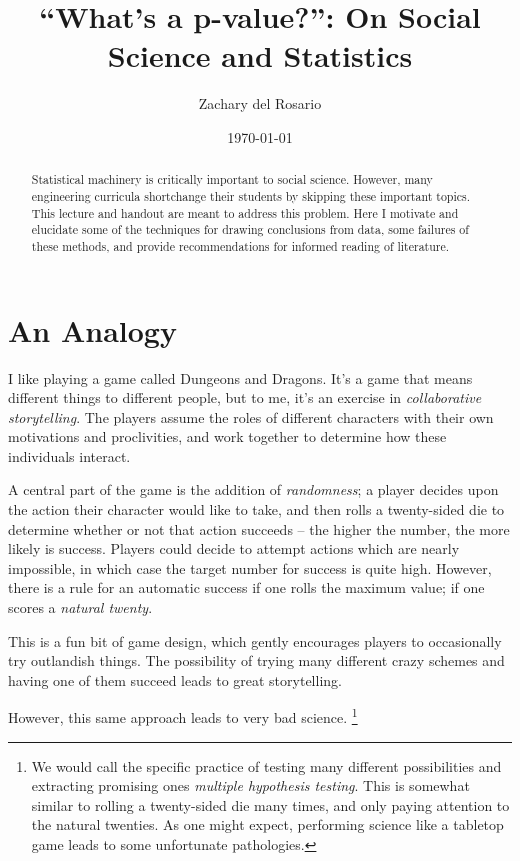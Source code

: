 \documentclass{tufte-handout}
\author{Zachary del Rosario}
\date{\today}
\title{``What's a p-value?'': On Social Science and Statistics}
\begin{document}
\maketitle
\begin{abstract}
\noindent
Statistical machinery is critically important to social science. However, many engineering
curricula shortchange their students by skipping these important topics. This lecture
and handout are meant to address this problem. Here I motivate and elucidate some of the
techniques for drawing conclusions from data, some failures of these methods, and
provide recommendations for informed reading of literature.
\end{abstract}

\section{An Analogy}
\label{sec:orge20846e}
I like playing a game called Dungeons and Dragons.\cite{mearls2014} It's a game
that means different things to different people, but to me, it's an exercise in
\emph{collaborative storytelling}. The players assume the roles of different
characters with their own motivations and proclivities, and work together to
determine how these individuals interact.

A central part of the game is the addition of \emph{randomness}; a player decides
upon the action their character would like to take, and then rolls a
twenty-sided die to determine whether or not that action succeeds -- the higher
the number, the more likely is success. Players could decide to attempt actions
which are nearly impossible, in which case the target number for success is
quite high. However, there is a rule for an automatic success if one rolls the
maximum value; if one scores a \emph{natural twenty}.


This is a fun bit of game design, which gently encourages players to
occasionally try outlandish things. The possibility of trying many different
crazy schemes and having one of them succeed leads to great storytelling.

However, this same approach leads to very bad science. \footnote{We would call the
specific practice of testing many different possibilities and extracting
promising ones \emph{multiple hypothesis testing}. This is somewhat similar to
rolling a twenty-sided die many times, and only paying attention to the natural
twenties. As one might expect, performing science like a tabletop game leads to
some unfortunate pathologies.}
\end{document}
